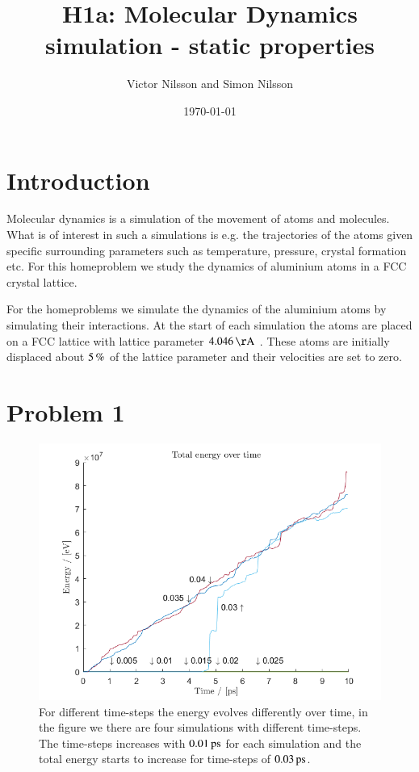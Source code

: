 



\title{H1a: Molecular Dynamics simulation - static properties}
\author{Victor Nilsson and Simon Nilsson}
\date{\today}





\section*{Introduction}

Molecular dynamics is a simulation of the movement of atoms and molecules. What is of interest in such a simulations is e.g. the trajectories of the atoms given specific surrounding parameters such as temperature, pressure, crystal formation etc. For this homeproblem we study the dynamics of aluminium atoms in a FCC crystal lattice.

For the homeproblems we simulate the dynamics of the aluminium atoms by simulating their interactions. At the start of each simulation the atoms are placed on a FCC lattice with lattice parameter $\unit[4.046]{Å}$ \cite{al_wiki}. These atoms are initially displaced about $\unit[5]{\%}$ of the lattice parameter and their velocities are set to zero.

\section*{Problem 1}

\begin{figure}[H]
    \centering
    \includegraphics[width=\textwidth]{graphics/task1/energy.png}
    \caption{For different time-steps the energy evolves differently over time, in the figure we there are four simulations with different time-steps. The time-steps increases with $\unit[0.01]{ps}$ for each simulation and the total energy starts to increase for time-steps of $\unit[0.03]{ps}$.}
    \label{fig:timestep}
\end{figure}

